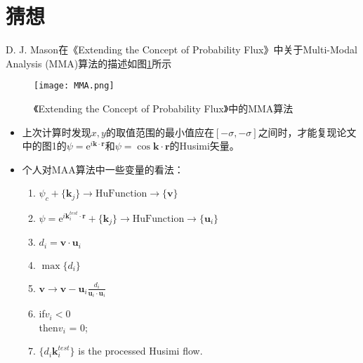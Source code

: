 \documentclass[UTF8]{ctexart}
\begin{document}
\newpage
\section*{猜想}
D. J. Mason在《Extending the Concept of Probability Flux》中关于Multi-Modal Analysis (MMA)算法的描述如图\ref{img:mma}所示
\begin{figure}
    \centering
    \texttt{[image: MMA.png]}
    \caption{《Extending the Concept of Probability Flux》中的MMA算法}
    \label{img:mma}
\end{figure}
\begin{itemize}
    \item 上次计算时发现$x,y$的取值范围的最小值应在$[-\sigma,-\sigma]$之间时，才能复现论文中的图1的$\psi=\mathrm{e}^{i\mathbf{k}\cdot\mathbf{r}}\text{和}\psi=\cos{\mathbf{k}\cdot\mathbf{r}}$的Husimi矢量。
    \item 个人对MAA算法中一些变量的看法：
        \begin{enumerate}
            \item $\psi_{c}  + \{\mathbf{k}_j\} \rightarrow \mathrm{HuFunction} \rightarrow \{\mathbf{v}\}$ 
            \item $\psi=\mathrm{e}^{i\mathbf{k}_i^{test}\cdot\mathbf{r}} + \{\mathbf{k}_j\} \rightarrow \mathrm{HuFunction} \rightarrow \{\mathbf{u}_i\}$
            \item $d_i = \mathbf{v}\cdot\mathbf{u}_i$
            \item $\max \{ d_i \}$
            \item $\mathbf{v} \rightarrow \mathbf{v} - \mathbf{u}_i\frac{d_i}{\mathbf{u}_{i}\cdot\mathbf{u}_{i}}$
            \item {\color{blue} if}\quad$v_i < 0$\\
                  {\color{blue} then}\quad$v_i$ = 0;
            \item $\{d_i\mathbf{k}_i^{test} \}$ is the processed Husimi flow.
        \end{enumerate}
\end{itemize}
%
\end{document}

